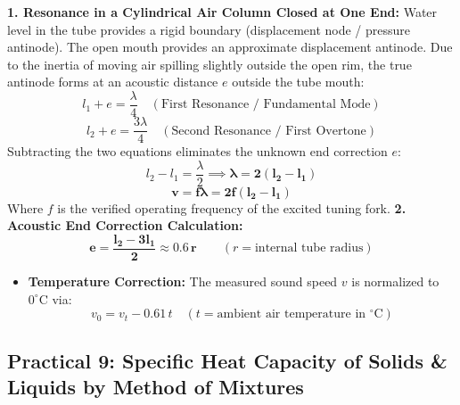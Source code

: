 \documentclass[10pt,twoside,openright]{book}
\begin{document}
\begin{formulabox}
\textbf{1. Resonance in a Cylindrical Air Column Closed at One End:}
Water level in the tube provides a rigid boundary (displacement node / pressure antinode). The open mouth provides an approximate displacement antinode. Due to the inertia of moving air spilling slightly outside the open rim, the true antinode forms at an acoustic distance $e$ outside the tube mouth:
\begin{equation}
  l_1 + e = \frac{\lambda}{4} \quad (\text{First Resonance / Fundamental Mode})
\end{equation}
\begin{equation}
  l_2 + e = \frac{3\lambda}{4} \quad (\text{Second Resonance / First Overtone})
\end{equation}
Subtracting the two equations eliminates the unknown end correction $e$:
\begin{equation}
  l_2 - l_1 = \frac{\lambda}{2} \implies \boldsymbol{\lambda = 2(l_2 - l_1)}
\end{equation}
\begin{equation}
  \mathbf{v = f \lambda = 2 f (l_2 - l_1)}
\end{equation}
Where $f$ is the verified operating frequency of the excited tuning fork.
\textbf{2. Acoustic End Correction Calculation:}
\begin{equation}
  \mathbf{e = \frac{l_2 - 3l_1}{2} \approx 0.6\,r} \qquad (r = \text{internal tube radius})
\end{equation}
\begin{itemize}
  \item \textbf{Temperature Correction:} The measured sound speed $v$ is normalized to $0^\circ\mathrm{C}$ via:
  \begin{equation}
    v_0 = v_t - 0.61\,t \quad (t = \text{ambient air temperature in }{}^\circ\mathrm{C})
  \end{equation}
\end{itemize}
\end{formulabox}

\subsection{Practical 9: Specific Heat Capacity of Solids \& Liquids by Method of Mixtures}
\end{document}
